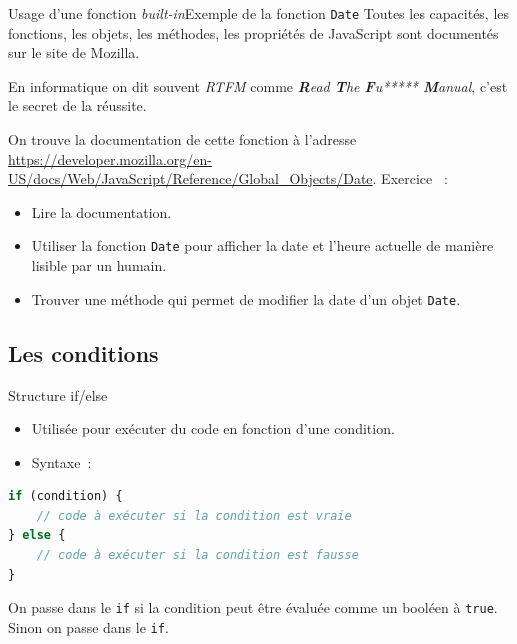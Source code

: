 \documentclass{beamer}
\begin{document}
    \begin{frame}{Usage d'une fonction \textit{built-in}}{Exemple de la fonction \lstinline{Date}}
        Toutes les capacités, les fonctions, les objets, les méthodes, les propriétés de JavaScript sont documentés sur le site de Mozilla.
        \bigbreak
        \begin{dangercolorbox}
            En informatique on dit souvent \textit{RTFM} comme \textit{\textbf{R}ead \textbf{T}he \textbf{F}u***** \textbf{M}anual}, c'est le secret de la réussite.
        \end{dangercolorbox}
        \bigbreak
        On trouve la documentation de cette fonction à l'adresse \url{https://developer.mozilla.org/en-US/docs/Web/JavaScript/Reference/Global_Objects/Date}.
        \bigbreak
        Exercice \execcounterdispinc{}~:
        \begin{itemize}
            \item Lire la documentation.
            \item Utiliser la fonction \lstinline{Date} pour afficher la date et l'heure actuelle
            de manière lisible par un humain.
            \item Trouver une méthode qui permet de modifier la date d'un objet \lstinline{Date}.
        \end{itemize}
    \end{frame}

    \subsection{Les conditions}\label{subsec:conditions}

    \begin{frame}[fragile]{Structure if/else}
        \begin{itemize}
            \item Utilisée pour exécuter du code en fonction d'une condition.
            \item Syntaxe~:
        \end{itemize}
        \begin{lstlisting}[language=JavaScript,title={\scriptsize{Script JavaScript}}]
if (condition) {
    // code à exécuter si la condition est vraie
} else {
    // code à exécuter si la condition est fausse
}
        \end{lstlisting}
        On passe dans le
        \lstinline{if} si la condition peut être évaluée comme un booléen à \lstinline{true}.
        Sinon on passe dans le \lstinline{if}.
    \end{frame}
\end{document}
